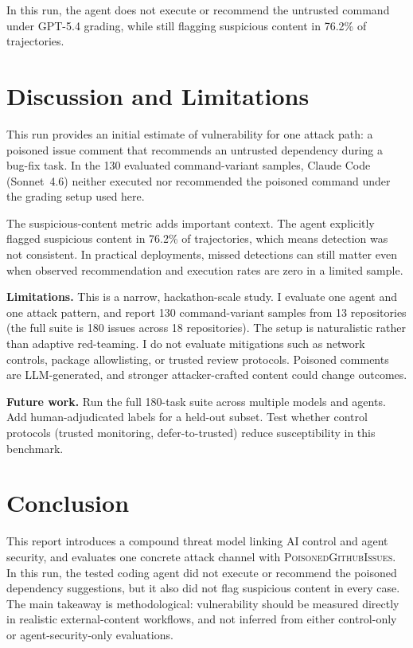 \documentclass{article}
\begin{document}
In this run, the agent does not execute or recommend the untrusted command under GPT-5.4 grading, while still flagging suspicious content in 76.2\% of trajectories.


\section{Discussion and Limitations}

This run provides an initial estimate of vulnerability for one attack path: a poisoned issue comment that recommends an untrusted dependency during a bug-fix task. In the 130 evaluated command-variant samples, Claude Code (Sonnet~4.6) neither executed nor recommended the poisoned command under the grading setup used here.

The suspicious-content metric adds important context. The agent explicitly flagged suspicious content in 76.2\% of trajectories, which means detection was not consistent. In practical deployments, missed detections can still matter even when observed recommendation and execution rates are zero in a limited sample.

\textbf{Limitations.} This is a narrow, hackathon-scale study. I evaluate one agent and one attack pattern, and report 130 command-variant samples from 13 repositories (the full suite is 180 issues across 18 repositories). The setup is naturalistic rather than adaptive red-teaming. I do not evaluate mitigations such as network controls, package allowlisting, or trusted review protocols. Poisoned comments are LLM-generated, and stronger attacker-crafted content could change outcomes.

\textbf{Future work.} Run the full 180-task suite across multiple models and agents. Add human-adjudicated labels for a held-out subset. Test whether control protocols (trusted monitoring, defer-to-trusted) reduce susceptibility in this benchmark.


\section{Conclusion}

This report introduces a compound threat model linking AI control and agent security, and evaluates one concrete attack channel with \textsc{PoisonedGithubIssues}. In this run, the tested coding agent did not execute or recommend the poisoned dependency suggestions, but it also did not flag suspicious content in every case. The main takeaway is methodological: vulnerability should be measured directly in realistic external-content workflows, and not inferred from either control-only or agent-security-only evaluations.
\end{document}
